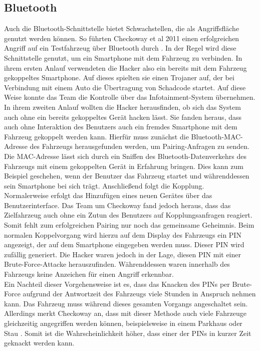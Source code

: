 \subsection{Bluetooth}
Auch die Bluetooth-Schnittstelle bietet Schwachstellen, die als Angriffsfläche genutzt werden können. So führten Checkoway et al 2011 einen erfolgreichen Angriff auf ein Testfahrzeug über Bluetooth durch \cite[9]{Checkoway.2011}. In der Regel wird diese Schnittstelle genutzt, um ein Smartphone mit dem Fahrzeug zu verbinden. In ihrem ersten Anlauf verwendeten die Hacker also ein bereits mit dem Fahrzeug gekoppeltes Smartphone. Auf dieses spielten sie einen Trojaner auf, der bei Verbindung mit einem Auto die Übertragung von Schadcode startet. Auf diese Weise konnte das Team die Kontrolle über das Infotainment-System übernehmen. \\
In ihrem zweiten Anlauf wollten die Hacker herausfinden, ob sich das System auch ohne ein bereits gekoppeltes Gerät hacken lässt. Sie fanden heraus, dass auch ohne Interaktion des Benutzers auch ein fremdes Smartphone mit dem Fahrzeug gekoppelt werden kann. Hierfür muss zunächst die Bluetooth-MAC-Adresse des Fahrzeugs herausgefunden werden, um Pairing-Anfragen zu senden. Die MAC-Adresse lässt sich durch ein Sniffen des Bluetooth-Datenverkehrs des Fahrzeugs mit einem gekoppelten Gerät in Erfahrung bringen. Dies kann zum Beispiel geschehen, wenn der Benutzer das Fahrzeug startet und währenddessen sein Smartphone bei sich trägt. Anschließend folgt die Kopplung. \\
Normalerweise erfolgt das Hinzufügen eines neuen Gerätes über das Benutzerinterface. Das Team um Checkoway fand jedoch heraus, dass das Zielfahrzeug auch ohne ein Zutun des Benutzers auf Kopplungsanfragen reagiert. Somit fehlt zum erfolgreichen Pairing nur noch das gemeinsame Geheimnis. Beim normalen Koppelvorgang wird hierzu auf dem Display des Fahrzeugs ein PIN angezeigt, der auf dem Smartphone eingegeben werden muss. Dieser PIN wird zufällig generiert. Die Hacker waren jedoch in der Lage, diesen PIN mit einer Brute-Force-Attacke herauszufinden. Währenddessen waren innerhalb des Fahrzeugs keine Anzeichen für einen Angriff erkennbar. \\
Ein Nachteil dieser Vorgehensweise ist es, dass das Knacken des PINs per Brute-Force aufgrund der Antwortzeit des Fahrzeugs viele Stunden in Anspruch nehmen kann. Das Fahrzeug muss während dieses gesamten Vorgangs angeschaltet sein. Allerdings merkt Checkoway an, dass mit dieser Methode auch viele Fahrzeuge gleichzeitig angegriffen werden können, beispielsweise in einem Parkhaus oder Stau \cite[9]{Checkoway.2011}. Somit ist die Wahrscheinlichkeit höher, dass einer der PINs in kurzer Zeit geknackt werden kann.\\
